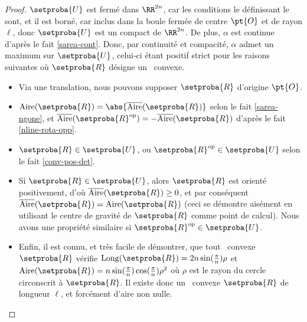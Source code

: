 \begin{proof}
     $\setproba{U}$ est fermé dans $\RR^{2n}$, car les conditions le définissant le sont, et il est borné, car inclus dans la boule fermée de centre $\pt{O}$ et de rayon $\ell$,
     donc $\setproba{U}$ est un compact de $\RR^{2n}$.
     De plus, $\alpha$ est continue d'après le fait \ref{sarea-cont}.
     Donc, par continuité et compacité, $\alpha$ admet un maximum sur $\setproba{U}$, celui-ci étant positif strict pour les raisons suivantes où $\setproba{R}$ désigne un \nreg\ convexe.
    \begin{itemize}
		\item Via une translation, nous pouvons supposer $\setproba{R}$ d'origine $\pt{O}$.

        \item $\area{\setproba{R}} = \abs{\sarea{\setproba{R}}}$
		selon le fait \ref{sarea-ngone},
		et
		$\sarea{\setproba{R}^{\mathrm{op}}} = - \sarea{\setproba{R}}$ d'après le fait \ref{nline-rota-opp}.
		
		\item $\setproba{R} \in \setproba{U}$, ou $\setproba{R}^{\mathrm{op}} \in \setproba{U}$ selon le fait \ref{conv-pos-det}.
		
		\item Si $\setproba{R} \in \setproba{U}$, alors 
		$\setproba{R}$ est orienté positivement, 
		d'où $\sarea{\setproba{R}} \geq 0$, 
		et par conséquent $\sarea{\setproba{R}} = \area{\setproba{R}}$ 
		(ceci se démontre aisément en utilisant le centre de gravité de $\setproba{R}$ comme point de calcul). 
		Nous avons une propriété similaire si $\setproba{R}^{\mathrm{op}} \in \setproba{U}$.

        \item Enfin, il est connu, et très facile de démontrer, que tout \nreg\ convexe $\setproba{R}$ vérifie
        $\cyclelen{\setproba{R}} = 2 n \sin (\frac{\pi}{n}) \rho$
		et
		$\area{\setproba{R}} = n \sin (\frac{\pi}{n})  \cos (\frac{\pi}{n}) \rho^2$
		où $\rho$ est le rayon du cercle circonscrit à $\setproba{R}$.
		Il existe donc un \nreg\ convexe $\setproba{R}$ de longueur $\ell$, et forcément d'aire non nulle.
    \end{itemize}


\end{proof}
